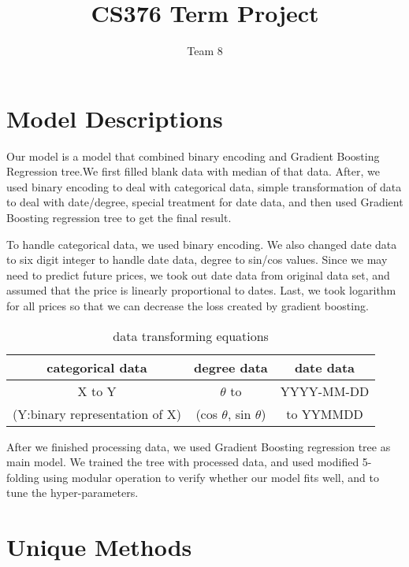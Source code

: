 \documentclass{article}
\title{CS376 Term Project}
\author{Team 8}
\begin{document}
\maketitle

\section{Model Descriptions}
Our model is a model that combined binary encoding and Gradient Boosting Regression tree.We first filled blank data with median of that data. After, we used binary encoding to deal with categorical data, simple transformation of data to deal with date/degree, special treatment for date data, and then used Gradient Boosting regression tree to get the final result.\par
To handle categorical data, we used binary encoding. We also changed date data to six digit integer to handle date data, degree to sin/cos values. Since we may need to predict future prices, we took out date data from original data set, and assumed that the price is linearly proportional to dates. Last, we took logarithm for all prices so that we can decrease the loss created by gradient boosting.\par
\begin{table} [ht]
\begin{center}
\caption{data transforming equations}
\begin{tabular} {c |c| c}
  \textbf{categorical data} & \textbf{degree data} & \textbf{date data}\\
\hline
X to Y &  $\theta$ to  & YYYY-MM-DD\\
(Y:binary representation of X) & (cos $\theta$, sin $\theta$) & to YYMMDD\\
\end{tabular}
\end{center}
\end{table}
After we finished processing data, we used Gradient Boosting regression tree as main model. We trained the tree with processed data, and used modified 5-folding using modular operation to verify whether our model fits well, and to tune the hyper-parameters.

\section{Unique Methods}
\end{document}
